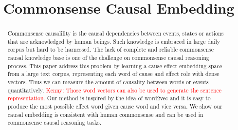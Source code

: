 \documentclass{article}
\title{Commonsense Causal Embedding}
\newcommand{\KZ}[1]{\textcolor{red}{Kenny: #1}}
\begin{document}
\maketitle

\begin{abstract}
Commonsense causalility is the causal dependencies between events, 
states or actions that are acknowledged by human beings. 
Such knowledge is embraced in large daily corpus but hard to be harnessed. 
The lack of complete and reliable commonsense causal knowledge base 
is one of the challenge on commonsense causal reasoning process.
This paper address this problem by learning a cause-effect embedding space
from a large text corpus, representing each word of cause and effect role 
with dense vectors. Thus we can measure the amount of causality between 
words or events quantitatively. \KZ{Those word vectors can also be used 
to generate the sentence representation.} 
Our method is inspired by the idea of word2vec and it is 
easy to produce the most possible effect word given cause word 
and vice versa.  We show our causal embedding is consistent with human
commonsense and can be used in commonsense causal reasoning tasks.
\end{abstract}

















\end{document}

